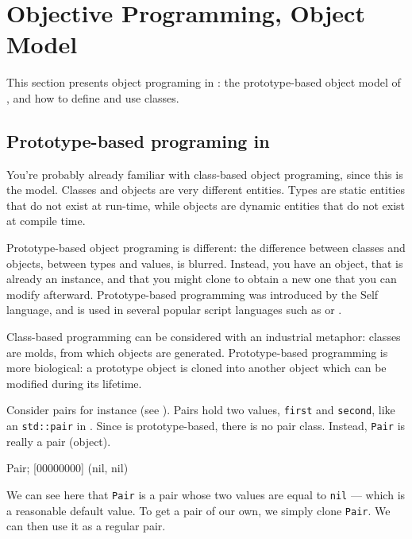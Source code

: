 
\chapter{Objective Programming, \us Object Model}
\label{sec:tut:object}

This section presents object programing in \us: the prototype-based
object model of \us, and how to define and use classes.

\section{Prototype-based programing in \us}

You're probably already familiar with class-based object programing, since
this is the \Cxx model.  Classes and objects are very different entities.
Types are static entities that do not exist at run-time, while objects are
dynamic entities that do not exist at compile time.

Prototype-based object programing is different: the difference between
classes and objects, between types and values, is blurred. Instead, you have
an object, that is already an instance, and that you might clone to obtain a
new one that you can modify afterward. Prototype-based programming was
introduced by the Self language, and is used in several popular script
languages such as \Io or \Js.

Class-based programming can be considered with an industrial metaphor:
classes are molds, from which objects are generated.  Prototype-based
programming is more biological: a prototype object is cloned into another
object which can be modified during its lifetime.

Consider pairs for instance (see ). Pairs hold two values,
\lstinline|first| and \lstinline|second|, like an \lstinline{std::pair} in
\Cxx. Since \us is prototype-based, there is no pair class. Instead,
\lstinline|Pair| is really a pair (object).

\begin{urbiscript}[firstnumber=1]
Pair;
[00000000] (nil, nil)
\end{urbiscript}

We can see here that \lstinline|Pair| is a pair whose two values are equal
to \lstinline|nil| --- which is a reasonable default value. To get a pair of
our own, we simply clone \lstinline|Pair|.  We can then use it as a regular
pair.

